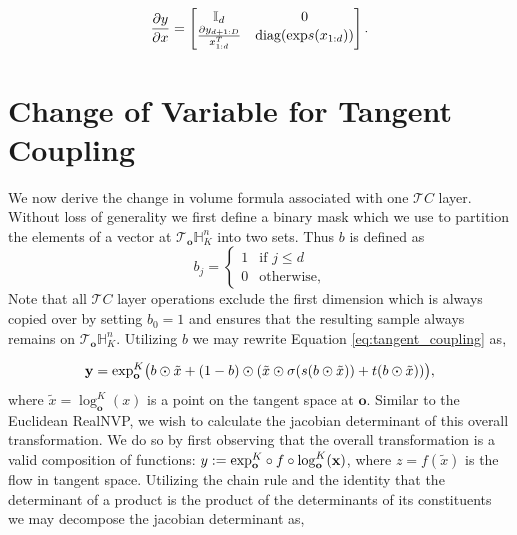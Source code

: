 \begin{equation} 
    \frac{\partial y}{\partial x} = \begin{bmatrix}
                                    \mathbb{I}_{d} & 0 \\
                                
                                   \frac{\partial y_{d+1:D}}{x^T_{1:d}} & \textnormal{diag}(\textnormal{exp}s(x_{1:d}))
                                    \end{bmatrix}.
\end{equation}

\section{Change of Variable for Tangent Coupling}
We now derive the change in volume formula associated with one $\mathcal{T}C$ layer. Without loss of generality we first define a binary mask which we use to partition the elements of a vector at $\mathcal{T}_{\textbf{o}}\mathbb{H}^n_K$ into two sets. Thus $b$ is defined as 
$$ 
b_j = 
\begin{cases}
1 &\textrm{if $j\leq d$}\\
0 &\textrm{otherwise},
\end{cases}
$$
Note that all $\mathcal{T}C$ layer operations exclude the first dimension which is always copied over by setting $b_0 = 1$ and ensures that the resulting sample always remains on $\mathcal{T}_{\textbf{o}}{\mathbb{H}^n_K}$. Utilizing $b$ we may rewrite Equation \ref{eq:tangent_coupling} as,

\label{tangent_coupling_proof_appendix}
\begin{equation}
    \textbf{y} =  \textnormal{exp}^K_{\textbf{o}}\big(b \odot \tilde{x} + (1 - b)\odot(\tilde{x} \odot \sigma(s(b \odot \tilde{x})) + t(b \odot \tilde{x}))\big),
\end{equation}
where $\tilde{x} = \log^K_{\textbf{o}}(x)$ is a point on the tangent space at $\textbf{o}$. Similar to the Euclidean RealNVP, we wish to calculate the jacobian determinant of this overall transformation. We do so by first observing that the overall transformation is a valid composition of functions: $y := \textnormal{exp}^K_{\textbf{o}} \circ f\circ \log^K_{\textbf{o}}(\textbf{x})$, where $z = f(\tilde{x})$ is the flow in tangent space. Utilizing the chain rule and the identity that the determinant of a product is the product of the determinants of its constituents we may decompose the jacobian determinant as,

